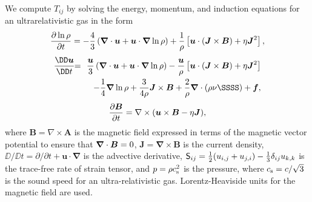 \documentclass[\mydriver,12pt,twoside,notitlepage,a4paper]{article}
\renewcommand{\vec}[1]{\mbox{\boldmath{$#1$}}}
\newcommand{\Bv}            {\vec{B}}
\newcommand{\Jv}            {\vec{J}}
\newcommand{\fv}            {\vec{f}}
\newcommand{\uv}            {\vec{u}}
\newcommand{\cs}            {c_{\rm s}}
\newcommand{\nab}{\mbox{\boldmath $\nabla$} {}}
\begin{document}
We compute $T_{ij}$ by solving the energy, momentum, and induction
equations for an ultrarelativistic gas in the
form \cite{BEO96,BKMRPTV17}
\begin{equation}
{\partial\ln\rho\over\partial t}=
-\frac{4}{3}\left(\nab\cdot\uv+\uv\cdot\nab\ln\rho\right)
+{1\over\rho}\left[\uv\cdot(\Jv\times\Bv)+\eta\Jv^2\right],
\label{dlnrhodt}
\end{equation}
\vspace{-6mm}
\begin{eqnarray}
{\DD\uv\over\DD t}\!\!&=&\!\!
{\uv\over3}\left(\nab\cdot\uv+\uv\cdot\nab\ln\rho\right)
-{\uv\over\rho}\left[\uv\cdot(\Jv\times\Bv)+\eta\Jv^2\right]
\nonumber
\\
&&-{1\over4}\nab\ln\rho
+{3\over4\rho}\Jv\times\Bv+{2\over\rho}\nab\cdot\left(\rho\nu\SSSS\right)+\fv,
\label{dudt}
\end{eqnarray}
\vspace{-6mm}
\begin{equation}
{\partial\Bv\over\partial t}=\nabla\times(\uv\times\Bv-\eta\Jv),
\label{mhd3}
\end{equation}
where ${\bm B}=\nabla \times {\bm A}$ is the magnetic field expressed
in terms of the magnetic vector potential to ensure that $\nab\cdot\Bv=0$,
$\bm{J}=\bm{\nabla}\times\bm{B}$ is the current density,
$\DD/\DD t=\partial/\partial t +\bm{u}\cdot\bm{\nabla}$
is the advective derivative,
${\sf S}_{ij}=\frac{1}{2}(u_{i,j}+u_{j,i})-\frac{1}{3}\delta_{ij}u_{k,k}$
is the trace-free rate of strain tensor, and $p=\rho\cs^2$ is the pressure,
where $\cs=c/\sqrt{3}$ is the sound speed for an ultra-relativistic gas.
Lorentz-Heaviside units for the magnetic field are used.
\end{document}
